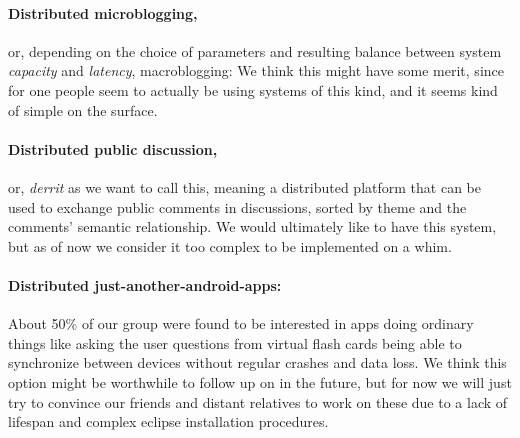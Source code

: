 \documentclass[12pt,a4paper,notitlepage]{article}
\begin{document}
\paragraph{Distributed microblogging,} or, depending on the choice of parameters and resulting balance between system
\emph{capacity} and \emph{latency}, macroblogging: We think this might have some merit, since for one people seem to
actually be using systems of this kind, and it seems kind of simple on the surface.

\paragraph{Distributed public discussion,} or, \emph{derrit} as we want to call this, meaning a distributed platform
that can be used to exchange public comments in discussions, sorted by theme and the comments' semantic relationship. We
would ultimately like to have this system, but as of now we consider it too complex to be implemented on a whim.

\paragraph{Distributed just-another-android-apps:} About 50\% of our group were found to be interested in apps
doing ordinary things like asking the user questions from virtual flash cards being able to synchronize between devices
without regular crashes and data loss. We think this option might be worthwhile to follow up on in the future, but for
now we will just try to convince our friends and distant relatives to work on these due to a lack of lifespan and
complex eclipse installation procedures.


\nocite{*}

\end{document}
